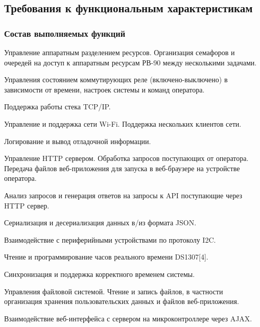 \subsection{Требования к функциональным характеристикам}
\subsubsection{Состав выполняемых функций}

\begin{my_enumerate}
\item Управление аппаратным разделением ресурсов. Организация семафоров и очередей на доступ к аппаратным ресурсам РВ-90 между несколькими задачами.
\item Управления состоянием коммутирующих реле (включено-выключено) в зависимости от времени, настроек системы и команд оператора.
\item Поддержка работы стека TCP/IP.
\item Управление и поддержка сети Wi-Fi. Поддержка нескольких клиентов сети.
\item Логирование и вывод отладочной информации.
\item Управление HTTP сервером. Обработка запросов поступающих от оператора. Передача файлов веб-приложения для запуска в веб-браузере на устройстве оператора. 
\item Анализ запросов и генерация ответов на запросы к API поступающие через HTTP сервер.
\item Сериализация и десериализация данных в/из формата JSON.
\item Взаимодействие с периферийными устройствами по протоколу I2C.
\item Чтение и программирование часов реального времени DS1307[4].
\item Синхронизация и поддержка корректного временем системы.
\item Управления файловой системой. Чтение и запись файлов, в частности организация хранения пользовательских данных и файлов веб-приложения.
\item Взаимодействие веб-интерфейса с сервером на микроконтроллере через AJAX.
\end{my_enumerate}

